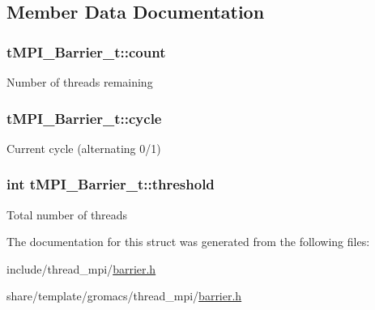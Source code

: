 \subsection{\-Member \-Data \-Documentation}
\hypertarget{structtMPI__Barrier__t_af2e5f903850086a31609f10552f6662f}{
\subsubsection[{count}]{ {\bf t\-M\-P\-I\-\_\-\-Barrier\-\_\-t\-::count}}}\label{structtMPI__Barrier__t_af2e5f903850086a31609f10552f6662f}
\-Number of threads remaining \hypertarget{structtMPI__Barrier__t_a4568bebd0b91f6e154a5f9ddd6ddf734}{
\subsubsection[{cycle}]{ {\bf t\-M\-P\-I\-\_\-\-Barrier\-\_\-t\-::cycle}}}\label{structtMPI__Barrier__t_a4568bebd0b91f6e154a5f9ddd6ddf734}
\-Current cycle (alternating 0/1) \hypertarget{structtMPI__Barrier__t_a30fa9e282d85bab5a124d36e1867f857}{
\subsubsection[{threshold}]{\setlength{\rightskip}{0pt plus 5cm}int {\bf t\-M\-P\-I\-\_\-\-Barrier\-\_\-t\-::threshold}}}\label{structtMPI__Barrier__t_a30fa9e282d85bab5a124d36e1867f857}
\-Total number of threads 

\-The documentation for this struct was generated from the following files\-:\begin{DoxyCompactItemize}
\item 
include/thread\-\_\-mpi/\hyperlink{include_2thread__mpi_2barrier_8h}{barrier.\-h}\item 
share/template/gromacs/thread\-\_\-mpi/\hyperlink{share_2template_2gromacs_2thread__mpi_2barrier_8h}{barrier.\-h}\end{DoxyCompactItemize}
